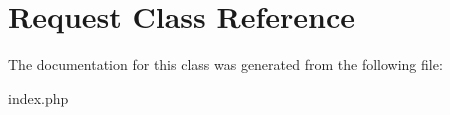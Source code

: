 \hypertarget{classRequest}{
\section{Request Class Reference}
\label{classRequest}
}


The documentation for this class was generated from the following file:\begin{DoxyCompactItemize}
\item 
index.php\end{DoxyCompactItemize}
